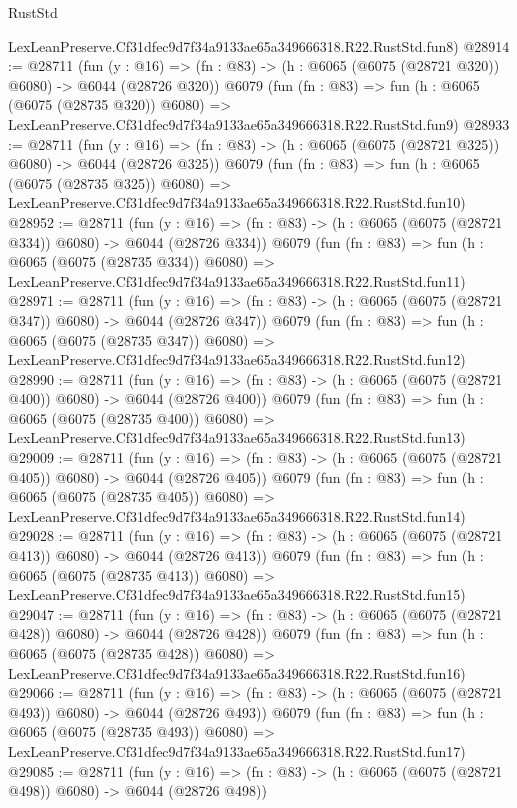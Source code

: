 \begin{lexlean}{RustStd}
\begin{coremodule}
    LexLeanPreserve.Cf31dfec9d7f34a9133ae65a349666318.R22.RustStd.fun8)
@28914 := @28711
    (fun (y : @16) => (fn : @83) -> (h : @6065 (@6075 (@28721 @320)) @6080) -> @6044 (@28726 @320))
    @6079
    (fun (fn : @83) =>
    fun (h : @6065 (@6075 (@28735 @320)) @6080) =>
    LexLeanPreserve.Cf31dfec9d7f34a9133ae65a349666318.R22.RustStd.fun9)
@28933 := @28711
    (fun (y : @16) => (fn : @83) -> (h : @6065 (@6075 (@28721 @325)) @6080) -> @6044 (@28726 @325))
    @6079
    (fun (fn : @83) =>
    fun (h : @6065 (@6075 (@28735 @325)) @6080) =>
    LexLeanPreserve.Cf31dfec9d7f34a9133ae65a349666318.R22.RustStd.fun10)
@28952 := @28711
    (fun (y : @16) => (fn : @83) -> (h : @6065 (@6075 (@28721 @334)) @6080) -> @6044 (@28726 @334))
    @6079
    (fun (fn : @83) =>
    fun (h : @6065 (@6075 (@28735 @334)) @6080) =>
    LexLeanPreserve.Cf31dfec9d7f34a9133ae65a349666318.R22.RustStd.fun11)
@28971 := @28711
    (fun (y : @16) => (fn : @83) -> (h : @6065 (@6075 (@28721 @347)) @6080) -> @6044 (@28726 @347))
    @6079
    (fun (fn : @83) =>
    fun (h : @6065 (@6075 (@28735 @347)) @6080) =>
    LexLeanPreserve.Cf31dfec9d7f34a9133ae65a349666318.R22.RustStd.fun12)
@28990 := @28711
    (fun (y : @16) => (fn : @83) -> (h : @6065 (@6075 (@28721 @400)) @6080) -> @6044 (@28726 @400))
    @6079
    (fun (fn : @83) =>
    fun (h : @6065 (@6075 (@28735 @400)) @6080) =>
    LexLeanPreserve.Cf31dfec9d7f34a9133ae65a349666318.R22.RustStd.fun13)
@29009 := @28711
    (fun (y : @16) => (fn : @83) -> (h : @6065 (@6075 (@28721 @405)) @6080) -> @6044 (@28726 @405))
    @6079
    (fun (fn : @83) =>
    fun (h : @6065 (@6075 (@28735 @405)) @6080) =>
    LexLeanPreserve.Cf31dfec9d7f34a9133ae65a349666318.R22.RustStd.fun14)
@29028 := @28711
    (fun (y : @16) => (fn : @83) -> (h : @6065 (@6075 (@28721 @413)) @6080) -> @6044 (@28726 @413))
    @6079
    (fun (fn : @83) =>
    fun (h : @6065 (@6075 (@28735 @413)) @6080) =>
    LexLeanPreserve.Cf31dfec9d7f34a9133ae65a349666318.R22.RustStd.fun15)
@29047 := @28711
    (fun (y : @16) => (fn : @83) -> (h : @6065 (@6075 (@28721 @428)) @6080) -> @6044 (@28726 @428))
    @6079
    (fun (fn : @83) =>
    fun (h : @6065 (@6075 (@28735 @428)) @6080) =>
    LexLeanPreserve.Cf31dfec9d7f34a9133ae65a349666318.R22.RustStd.fun16)
@29066 := @28711
    (fun (y : @16) => (fn : @83) -> (h : @6065 (@6075 (@28721 @493)) @6080) -> @6044 (@28726 @493))
    @6079
    (fun (fn : @83) =>
    fun (h : @6065 (@6075 (@28735 @493)) @6080) =>
    LexLeanPreserve.Cf31dfec9d7f34a9133ae65a349666318.R22.RustStd.fun17)
@29085 := @28711
    (fun (y : @16) => (fn : @83) -> (h : @6065 (@6075 (@28721 @498)) @6080) -> @6044 (@28726 @498))

\end{coremodule}
\end{lexlean}
